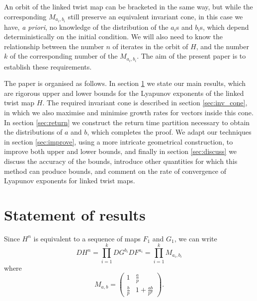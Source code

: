 \documentclass{iopart}
\begin{document}
An orbit of the linked twist map can be bracketed in the same way, but while the corresponding $M_{a_i,b_i}$ still preserve an equivalent invariant cone, in this case we have, {\em a priori}, no knowledge of the distribution of the $a_i$s and $b_i$s, which depend deterministically on the initial condition. We will also need to know the relationship between the number $n$ of iterates in the orbit of $H$, and the number $k$ of the corresponding number of the $M_{a_i,b_i}$. The aim of the present paper is to establish these requirements.

The paper is organised as follows. In section \ref{sec:statement} we state our main results, which are rigorous upper and lower bounds for the Lyapunov exponents of  the linked twist map $H$. The required invariant cone is described in section \ref{sec:inv_cone}, in which we also maximise and minimise growth rates for vectors inside this cone. In section \ref{sec:return} we construct the return time partition necessary to obtain the distributions of $a$ and $b$, which completes the proof. We adapt our techniques in section \ref{sec:improve}, using a more intricate geometrical construction, to improve both upper and lower bounds, and finally in section \ref{sec:discuss} we discuss the accuracy of the bounds, introduce other quantities for which this method can produce bounds, and comment on the rate of convergence of Lyapunov exponents for linked twist maps.

\section{Statement of results}\label{sec:statement}


Since $H^n$ is equivalent to a sequence of maps $F_1$ and $G_1$, we can write
\begin{equation}\label{DHn}
DH^n  = \prod_{i=1}^k DG^{b_i} DF^{a_i} = \prod_{i=1}^k M_{a_i,b_i}
\end{equation}
where
\begin{equation}\label{eq:Mab}
M_{a,b} = \left( \begin{array}{cc} 1 & \frac{a}{p} \\ \frac{b}{p} & 1+\frac{ab}{p^2} \end{array} \right).
\end{equation}
\end{document}
